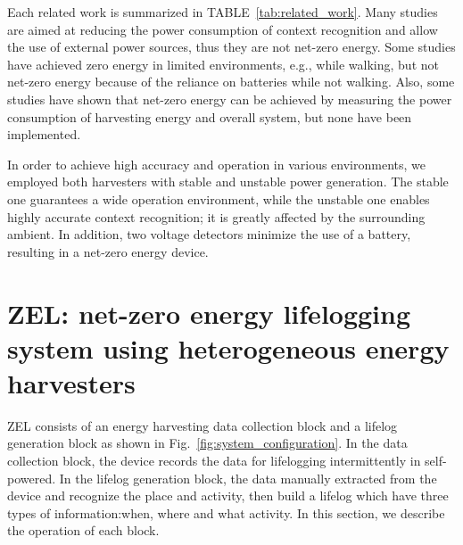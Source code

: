 \documentclass[conference]{IEEEtran}
\begin{document}
Each related work is summarized in TABLE~\ref{tab:related_work}.
Many studies are aimed at reducing the power consumption of context recognition and allow the use of external power sources, thus they are not net-zero energy.
Some studies have achieved zero energy in limited environments, e.g., while walking, but not net-zero energy because of the reliance on batteries while not walking.
Also, some studies have shown that net-zero energy can be achieved by measuring the power consumption of harvesting energy and overall system, but none have been implemented.

In order to achieve high accuracy and operation in various environments, we employed both harvesters with stable and unstable power generation.
The stable one guarantees a wide operation environment, while the unstable one enables highly accurate context recognition; it is greatly affected by the surrounding ambient.
In addition, two voltage detectors minimize the use of a battery, resulting in a net-zero energy device.

\section{ZEL: net-zero energy lifelogging system using heterogeneous energy harvesters} \label{sec:proposed_system}
ZEL consists of an energy harvesting data collection block and a lifelog generation block as shown in Fig.~\ref{fig:system_configuration}.
In the data collection block, the device records the data for lifelogging intermittently in self-powered.
In the lifelog generation block, the data manually extracted from the device and recognize the place and activity, then build a lifelog which have three types of information:when, where and what activity.
In this section, we describe the operation of each block.
\end{document}
